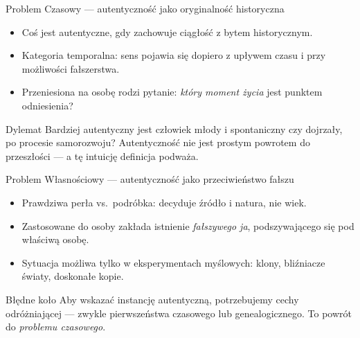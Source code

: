\documentclass{beamer}
\begin{document}
\begin{frame}{Problem Czasowy --- autentyczność jako oryginalność historyczna}
  \begin{itemize}
    \item Coś jest autentyczne, gdy zachowuje ciągłość z bytem historycznym.
    \item Kategoria temporalna: sens pojawia się dopiero z upływem czasu
          i przy możliwości fałszerstwa.
    \item Przeniesiona na osobę rodzi pytanie: \emph{który moment życia} jest
          punktem odniesienia?
  \end{itemize}
  \vspace{0.5em}
  \begin{block}{Dylemat}
    Bardziej autentyczny jest człowiek młody i spontaniczny czy dojrzały,
    po procesie samorozwoju? Autentyczność nie jest prostym powrotem do
    przeszłości --- a tę intuicję definicja podważa.
  \end{block}
\end{frame}
 
\begin{frame}{Problem Własnościowy --- autentyczność jako przeciwieństwo fałszu}
  \begin{itemize}
    \item Prawdziwa perła vs.\ podróbka: decyduje źródło i natura, nie wiek.
    \item Zastosowane do osoby zakłada istnienie \emph{fałszywego ja},
          podszywającego się pod właściwą osobę.
    \item Sytuacja możliwa tylko w eksperymentach myślowych: klony,
          bliźniacze światy, doskonałe kopie.
  \end{itemize}
  \vspace{0.5em}
  \begin{block}{Błędne koło}
    Aby wskazać instancję autentyczną, potrzebujemy cechy odróżniającej ---
    zwykle pierwszeństwa czasowego lub genealogicznego. To powrót do
    \emph{problemu czasowego}.
  \end{block}
\end{frame}
 
\end{document}
